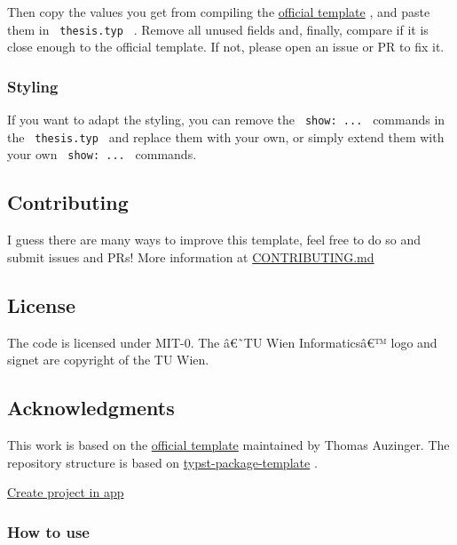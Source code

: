 Then copy the values you get from compiling the
\href{https://gitlab.com/ThomasAUZINGER/vutinfth}{official template} ,
and paste them in \texttt{\ thesis.typ\ } . Remove all unused fields
and, finally, compare if it is close enough to the official template. If
not, please open an issue or PR to fix it.

\subsubsection{Styling}\label{styling}

If you want to adapt the styling, you can remove the
\texttt{\ show:\ ...\ } commands in the \texttt{\ thesis.typ\ } and
replace them with your own, or simply extend them with your own
\texttt{\ show:\ ...\ } commands.

\subsection{Contributing}\label{contributing}

I guess there are many ways to improve this template, feel free to do so
and submit issues and PRs! More information at
\href{https://github.com/Otto-AA/unofficial-tu-wien-thesis-template/blob/main/CONTRIBUTING.md}{CONTRIBUTING.md}

\subsection{License}\label{license}

The code is licensed under MIT-0. The â€˜TU Wien Informaticsâ€™ logo and
signet are copyright of the TU Wien.

\subsection{Acknowledgments}\label{acknowledgments}

This work is based on the
\href{https://gitlab.com/ThomasAUZINGER/vutinfth}{official template}
maintained by Thomas Auzinger. The repository structure is based on
\href{https://github.com/typst-community/typst-package-template}{typst-package-template}
.

\href{/app?template=definitely-not-tuw-thesis&version=0.1.0}{Create
project in app}

\subsubsection{How to use}\label{how-to-use}

